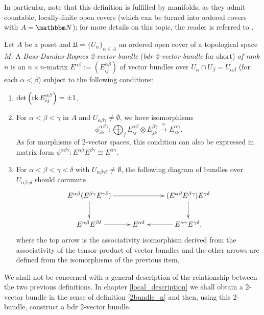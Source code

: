 In particular, note that this definition is fulfilled by manifolds, as they admit countable, locally-finite open covers (which can be turned into ordered covers with $A=\natu$); for more details on this topic, the reader is referred to \cite{lee:_ism}.

\begin{defi}\label{bdr_2bundle}
Let $A$ be a poset and $\mathfrak{U}=\{U_{\alpha }\}_{\alpha \in A}$ an ordered open cover of a topological space $M$. A \emph{Bass-Dundas-Rognes 2-vector bundle} (\emph{{\sc bdr} 2-vector bundle} for short) \emph{of rank} $n$ is an $n\times n$-matrix $E^{\alpha \beta}:=(E_{ij}^{\alpha \beta})$ of vector bundles over $U_\alpha \cap U_\beta =U_{\alpha \beta}$ (for each $\alpha < \beta$) subject to the following conditions:
\begin{enumerate}
\item $\det \left (\operatorname{rk}E_{ij}^{\alpha \beta}\right )=\pm 1$.
\item For $\alpha <\beta <\gamma$ in $A$ and $U_{\alpha \beta \gamma }\neq \emptyset$, we have isomorphisms
$$\phi^{\alpha \beta \gamma}_{ik}:\bigoplus_jE_{ij}^{\alpha \beta}\otimes E_{jk}^{\beta \gamma}\stackrel{\cong}{\longrightarrow} E_{ik}^{\alpha \gamma}.$$
As for morphisms of 2-vector spaces, this condition can also be expressed in matrix form $\phi^{\alpha \beta \gamma}:E^{\alpha \beta}E^{\beta \gamma }\cong E^{\alpha \gamma }$.
\item For $\alpha <\beta <\gamma <\delta$ with $U_{\alpha \beta \gamma \delta}\neq \emptyset$, the following diagram
of bundles over $U_{\alpha \beta \gamma \delta}$ should commute
$$\xymatrix{
E^{\alpha \beta}(E^{\beta \gamma }E^{\gamma \delta }) \ar[rr] \ar[d] & & (E^{\alpha \beta }E^{\beta \gamma })E^{\gamma \delta } \ar[d] \\
E^{\alpha \beta }E^{\beta \delta } \ar[r] & E^{\alpha \delta } & E^{\alpha \gamma }E^{\gamma \delta }, \ar[l] }
$$
where the top arrow is the associativity isomorphism derived from the associativity of the tensor product of vector bundles and the other arrows are defined from the isomorphisms of the previous item.
\end{enumerate}
\end{defi}

We shall not be concerned with a general description of the relationship between the two previous definitions. In chapter \ref{local_description} we shall obtain a 2-vector bundle in the sense of definition \ref{2bundle_n} and then, using this 2-bundle, construct a {\sc bdr} 2-vector bundle.


